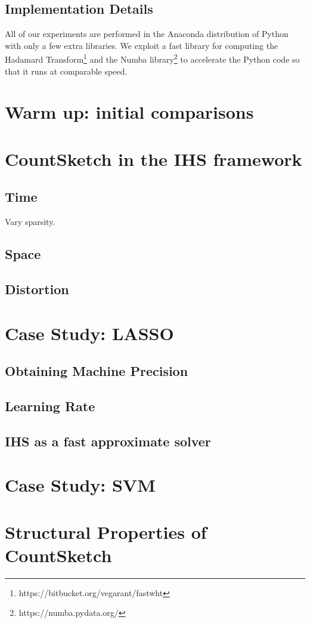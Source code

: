 \documentclass[twoside]{article}
\theoremstyle{definition}\newtheorem{thm}{Theorem}[section]
\theoremstyle{definition}\newtheorem{mydef}[thm]{Definition}
\theoremstyle{definition}\newtheorem{rem}[thm]{Remark}
\theoremstyle{definition}\newtheorem{prop}[thm]{Proposition}
\theoremstyle{definition}\newtheorem{example}[thm]{Example}
\theoremstyle{definition}\newtheorem{claim}[thm]{Claim}
\theoremstyle{definition}\newtheorem{Qu}[thm]{Question}
\theoremstyle{definition}\newtheorem{Lemma}[thm]{Lemma}
\theoremstyle{definition}\newtheorem{Cor}[thm]{Corollary}
\theoremstyle{definition}\newtheorem{Fact}[]{Fact}
\begin{document}
\subsection{Implementation Details}

All of our experiments are performed in the Anaconda distribution of Python
with only a few extra libraries.
We exploit a fast library for computing the Hadamard
Transform\footnote{https://bitbucket.org/vegarant/fastwht} and the Numba
library\footnote{https://numba.pydata.org/} to accelerate the Python code
so that it runs at comparable speed.



\section{Warm up: initial comparisons}



\section{CountSketch in the IHS framework} \label{sec: countsketch-ihs}





\subsection{Time}
Vary sparsity.
\subsection{Space}

\subsection{Distortion}



\section{Case Study: LASSO}


\subsection{Obtaining Machine Precision}

\subsection{Learning Rate}

\subsection{IHS as a fast approximate solver}

\section{Case Study: SVM}


\appendix

\section{Structural Properties of CountSketch} \label{sec: countsketch-proofs}







\end{document}
